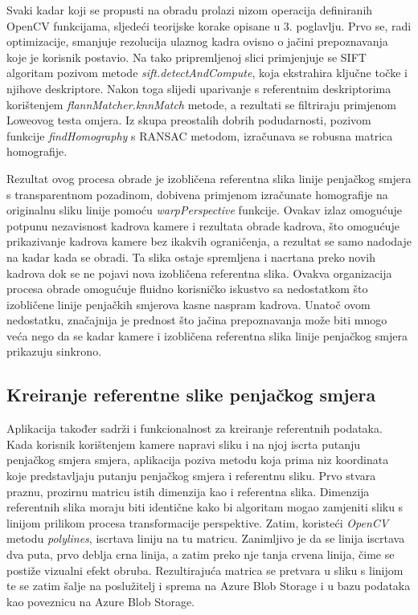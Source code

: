 Svaki kadar koji se propusti na obradu prolazi nizom operacija definiranih OpenCV funkcijama, sljedeći teorijske korake opisane u 3. poglavlju. Prvo se, radi optimizacije, smanjuje rezolucija ulaznog kadra ovisno o jačini prepoznavanja koje je korisnik postavio. Na tako pripremljenoj slici primjenjuje se SIFT algoritam pozivom metode \textit{sift.detectAndCompute}, koja ekstrahira ključne točke i njihove deskriptore. 
Nakon toga slijedi uparivanje s referentnim deskriptorima korištenjem \textit{flannMatcher.knnMatch} metode, a rezultati se filtriraju primjenom Loweovog testa omjera. Iz skupa preostalih dobrih podudarnosti, pozivom funkcije \textit{findHomography} s RANSAC metodom, izračunava se robusna matrica homografije.

Rezultat ovog procesa obrade je izobličena referentna slika linije penjačkog smjera s transparentnom pozadinom, dobivena primjenom izračunate homografije na originalnu sliku linije pomoću \textit{warpPerspective} funkcije. Ovakav izlaz omogućuje potpunu nezavisnost kadrova kamere i rezultata obrade kadrova, što omogućuje prikazivanje kadrova kamere bez ikakvih ograničenja, a rezultat se samo nadodaje na kadar kada se obradi. 
Ta slika ostaje spremljena i nacrtana preko novih kadrova dok se ne pojavi nova izobličena referentna slika. Ovakva organizacija procesa obrade omogućuje fluidno korisničko iskustvo sa nedostatkom što izobličene linije penjačkih smjerova kasne naspram kadrova. Unatoč ovom nedostatku, značajnija je prednost što jačina prepoznavanja može biti mnogo veća nego da se kadar kamere i izobličena referentna slika linije penjačkog smjera prikazuju sinkrono.

\subsection{Kreiranje referentne slike penjačkog smjera}

Aplikacija također sadrži i funkcionalnost za kreiranje referentnih podataka. Kada korisnik korištenjem kamere napravi sliku i na njoj iscrta putanju penjačkog smjera smjera, aplikacija poziva metodu koja prima niz koordinata koje predstavljaju putanju penjačkog smjera i referentnu sliku. Prvo stvara praznu, prozirnu matricu istih dimenzija kao i referentna slika. Dimenzija referentnih slika moraju biti identične kako bi algoritam mogao zamjeniti sliku s linijom prilikom procesa transformacije perspektive. Zatim, koristeći \textit{OpenCV} metodu \textit{polylines}, iscrtava liniju na tu matricu. Zanimljivo je da se linija iscrtava dva puta, prvo deblja crna linija, a zatim preko nje tanja crvena linija, čime se postiže vizualni efekt obruba. Rezultirajuća matrica se pretvara u sliku s linijom te se zatim šalje na poslužitelj i sprema na Azure Blob Storage i u bazu podataka kao poveznicu na Azure Blob Storage.


